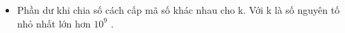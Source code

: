 \begin{itemize}
	\item     Phần dư khi chia số cách cấp mã số khác nhau cho k. Với k là số nguyên tố nhỏ nhất lớn hơn $10^{9}$    .   
\end{itemize}